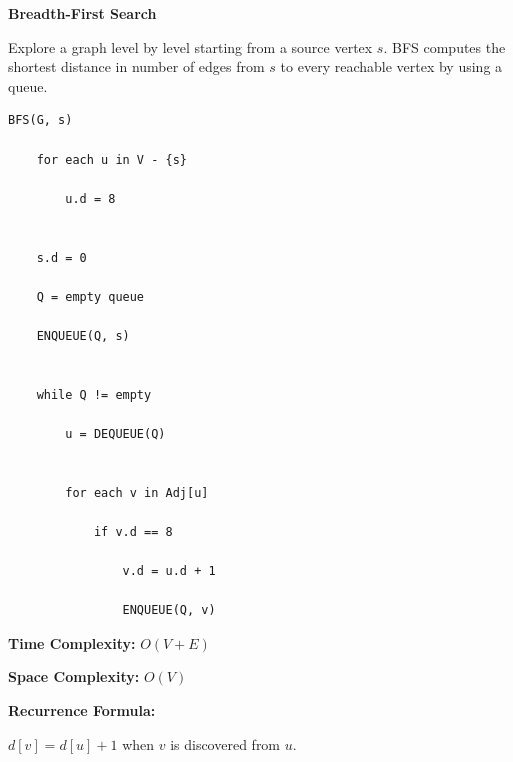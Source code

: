 \documentclass[a4paper,12pt]{article}
\begin{document}
\begin{tcolorbox}[
    colback=gray!30,
    colframe=black,
    boxrule=1pt,
    arc=0mm
]

\begin{tcolorbox}[
    colback=gray!10,
    colframe=black,
    arc=0mm
]
\centering
{\Huge\bfseries Breadth-First Search}
\end{tcolorbox}


\begin{tcolorbox}[
    colback=gray!10,
    colframe=black,
    arc=0mm
]
\small
Explore a graph level by level starting from a source vertex $s$.
BFS computes the shortest distance in number of edges from $s$ to every
reachable vertex by using a queue.
\end{tcolorbox}


\begin{tcolorbox}[
    colback=black!5,
    colframe=black,
    arc=0mm,
    title=Pseudo-code
]
\tiny
\begin{lstlisting}
BFS(G, s)

    for each u in V - {s}

        u.d = 8


    s.d = 0

    Q = empty queue

    ENQUEUE(Q, s)


    while Q != empty

        u = DEQUEUE(Q)


        for each v in Adj[u]

            if v.d == 8

                v.d = u.d + 1

                ENQUEUE(Q, v)
\end{lstlisting}
\end{tcolorbox}


\begin{tcolorbox}[
    colback=cyan!20,
    colframe=black,
    arc=0mm
]
\small
\textbf{Time Complexity:}
$O(V+E)$
\end{tcolorbox}


\begin{tcolorbox}[
    colback=violet!20,
    colframe=black,
    arc=0mm
]
\small
\textbf{Space Complexity:}
$O(V)$
\end{tcolorbox}


\begin{tcolorbox}[
    colback=pink!20,
    colframe=black,
    arc=0mm
]
\small
\textbf{Recurrence Formula:}

$d[v]=d[u]+1$ when $v$ is discovered from $u$.
\end{tcolorbox}

\end{tcolorbox}
\end{document}
